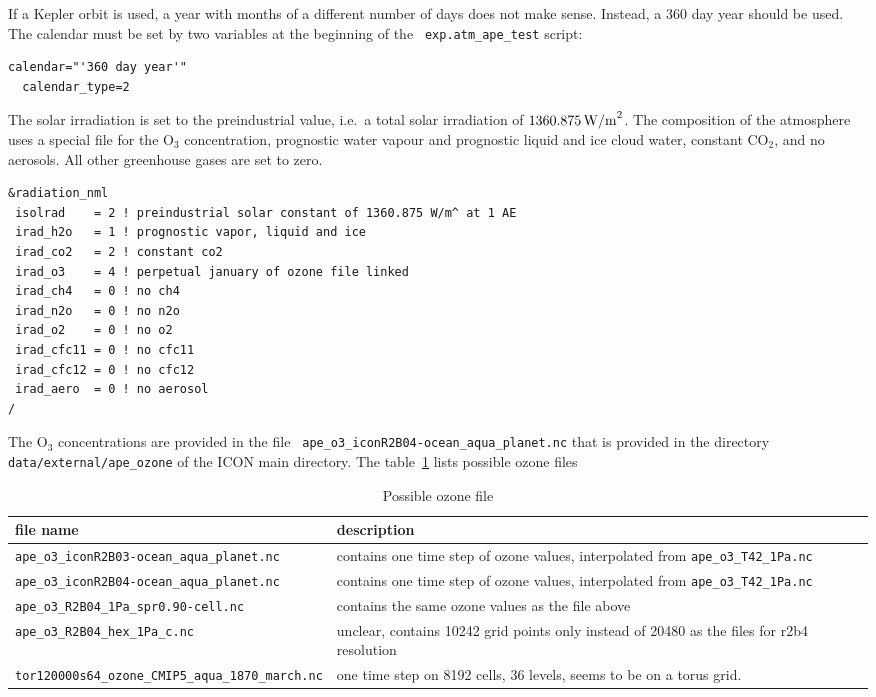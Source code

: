 If a Kepler orbit is used, a year with months of a different number of
days does not make sense. Instead, a 360 day year should be used.
The calendar must be set by two variables at the beginning of the {\tt
  exp.atm\_ape\_test} script:

\begin{lstlisting}[caption=Calendar for APE ({\tt
    exp.atm\_ape\_test}), label=cr20160216_calendar]
  calendar="'360 day year'"
  calendar_type=2
\end{lstlisting}

The solar irradiation is set to the preindustrial value, i.e.~a total
solar irradiation of $1360.875\,{\rm W/m}^2$. The composition of the
atmosphere uses a special file for the O$_3$ concentration, prognostic
water vapour and prognostic liquid and ice cloud water, constant CO$_2$, and no
aerosols. All 
other greenhouse gases are set to zero. 

\begin{lstlisting}[caption=Solar irradiation and composition of
  atmosphere ({\tt exp.atm\_ape\_test}), label=cr20160216_radiationnml] 
&radiation_nml
 isolrad    = 2 ! preindustrial solar constant of 1360.875 W/m^ at 1 AE
 irad_h2o   = 1 ! prognostic vapor, liquid and ice
 irad_co2   = 2 ! constant co2
 irad_o3    = 4 ! perpetual january of ozone file linked
 irad_ch4   = 0 ! no ch4
 irad_n2o   = 0 ! no n2o
 irad_o2    = 0 ! no o2
 irad_cfc11 = 0 ! no cfc11
 irad_cfc12 = 0 ! no cfc12
 irad_aero  = 0 ! no aerosol
/
\end{lstlisting}

The O$_3$ concentrations are provided in the file {\tt
  ape\_o3\_iconR2B04-ocean\_aqua\_planet.nc} that is provided in the
directory {\tt data/external/ape\_ozone} of the ICON main directory.
The table~\ref{cr20160216_tabozone} lists possible ozone files

\begin{table}[ht]\caption{Possible ozone file}\label{cr20160216_tabozone}
\begin{tabular*}{\textwidth}{l@{\extracolsep\fill}p{7.8cm}}\hline
file name & description\\\hline
{\tt ape\_o3\_iconR2B03-ocean\_aqua\_planet.nc} & contains one time
step of ozone values, interpolated from {\tt ape\_o3\_T42\_1Pa.nc}\\
{\tt ape\_o3\_iconR2B04-ocean\_aqua\_planet.nc} & contains one time
step of ozone values, interpolated from {\tt ape\_o3\_T42\_1Pa.nc}\\
{\tt ape\_o3\_R2B04\_1Pa\_spr0.90-cell.nc} & contains the same ozone
values as the file above\\
{\tt ape\_o3\_R2B04\_hex\_1Pa\_c.nc} & unclear, contains 10242 grid
points only instead of 20480 as the files for r2b4 resolution\\
{\tt tor120000s64\_ozone\_CMIP5\_aqua\_1870\_march.nc} & one time step
on 8192 cells, 36 levels, seems to be on a torus grid.\\
\hline
\end{tabular*}
\end{table}



